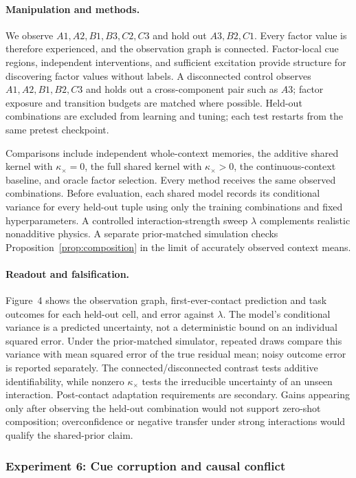 \paragraph{Manipulation and methods.}
We observe $A1,A2,B1,B3,C2,C3$ and hold out $A3,B2,C1$. Every factor value is therefore experienced, and the observation graph is connected. Factor-local cue regions, independent interventions, and sufficient excitation provide structure for discovering factor values without labels. A disconnected control observes $A1,A2,B1,B2,C3$ and holds out a cross-component pair such as $A3$; factor exposure and transition budgets are matched where possible. Held-out combinations are excluded from learning and tuning; each test restarts from the same pretest checkpoint.

Comparisons include independent whole-context memories, the additive shared kernel with $\kappa_\times=0$, the full shared kernel with $\kappa_\times>0$, the continuous-context baseline, and oracle factor selection. Every method receives the same observed combinations. Before evaluation, each shared model records its conditional variance for every held-out tuple using only the training combinations and fixed hyperparameters. A controlled interaction-strength sweep $\lambda$ complements realistic nonadditive physics. A separate prior-matched simulation checks Proposition~\ref{prop:composition} in the limit of accurately observed context means.

\paragraph{Readout and falsification.}
Figure~4 shows the observation graph, first-ever-contact prediction and task outcomes for each held-out cell, and error against $\lambda$. The model's conditional variance is a predicted uncertainty, not a deterministic bound on an individual squared error. Under the prior-matched simulator, repeated draws compare this variance with mean squared error of the true residual mean; noisy outcome error is reported separately. The connected/disconnected contrast tests additive identifiability, while nonzero $\kappa_\times$ tests the irreducible uncertainty of an unseen interaction. Post-contact adaptation requirements are secondary. Gains appearing only after observing the held-out combination would not support zero-shot composition; overconfidence or negative transfer under strong interactions would qualify the shared-prior claim.

\subsubsection{Experiment 6: Cue corruption and causal conflict}

